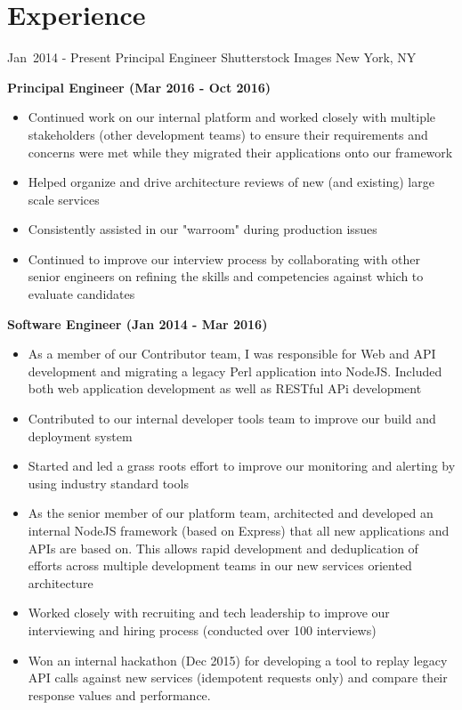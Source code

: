 \documentclass[11pt,letterpaper,sans]{moderncv}
\begin{document}
\makecvtitle

\section{Experience}
\cventry
{
\mbox{Jan 2014}
-
\mbox{Present}
}
{Principal Engineer}
{Shutterstock Images}
{New York, NY}
{}
{
\textbf{
Principal Engineer (Mar 2016 - Oct 2016)
}
\begin{itemize}
\item Continued work on our internal platform and worked closely with multiple stakeholders (other development teams) to ensure their requirements and concerns were met while they migrated their applications onto our framework
\item Helped organize and drive architecture reviews of new (and existing) large scale services
\item Consistently assisted in our "warroom" during production issues
\item Continued to improve our interview process by collaborating with other senior engineers on refining the skills and competencies against which to evaluate candidates
\end{itemize}
\textbf{
Software Engineer (Jan 2014 - Mar 2016)
}
\begin{itemize}
\item As a member of our Contributor team, I was responsible for Web and API development and migrating a legacy Perl application into NodeJS. Included both web application development as well as RESTful APi development
\item Contributed to our internal developer tools team to improve our build and deployment system
\item Started and led a grass roots effort to improve our monitoring and alerting by using industry standard tools
\item As the senior member of our platform team, architected and developed an internal NodeJS framework (based on Express) that all new applications and APIs are based on. This allows rapid development and deduplication of efforts across multiple development teams in our new services oriented architecture
\item Worked closely with recruiting and tech leadership to improve our interviewing and hiring process (conducted over 100 interviews)
\item Won an internal hackathon (Dec 2015) for developing a tool to replay legacy API calls against new services (idempotent requests only) and compare their response values and performance.
\end{itemize}
}
\end{document}
